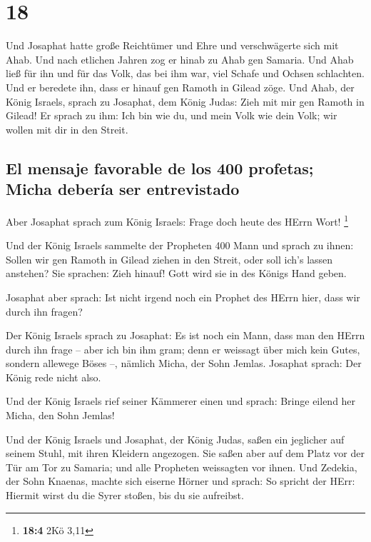 \hypertarget{section-17}{%
\section{18}\label{section-17}}

 Und Josaphat hatte große Reichtümer und Ehre und
verschwägerte sich mit Ahab.  Und nach etlichen Jahren zog
er hinab zu Ahab gen Samaria. Und Ahab ließ für ihn und für das Volk,
das bei ihm war, viel Schafe und Ochsen schlachten. Und er beredete ihn,
dass er hinauf gen Ramoth in Gilead zöge.  Und Ahab, der
König Israels, sprach zu Josaphat, dem König Judas: Zieh mit mir gen
Ramoth in Gilead! Er sprach zu ihm: Ich bin wie du, und mein Volk wie
dein Volk; wir wollen mit dir in den Streit.

\hypertarget{el-mensaje-favorable-de-los-400-profetas-micha-deberuxeda-ser-entrevistado}{%
\subsection{El mensaje favorable de los 400 profetas; Micha debería ser
entrevistado}\label{el-mensaje-favorable-de-los-400-profetas-micha-deberuxeda-ser-entrevistado}}

 Aber Josaphat sprach zum König Israels: Frage doch heute
des HErrn Wort! \footnote{\textbf{18:4} 2Kö 3,11}

 Und der König Israels sammelte der Propheten 400 Mann und
sprach zu ihnen: Sollen wir gen Ramoth in Gilead ziehen in den Streit,
oder soll ich's lassen anstehen? Sie sprachen: Zieh hinauf! Gott wird
sie in des Königs Hand geben.

 Josaphat aber sprach: Ist nicht irgend noch ein Prophet
des HErrn hier, dass wir durch ihn fragen?

 Der König Israels sprach zu Josaphat: Es ist noch ein
Mann, dass man den HErrn durch ihn frage -- aber ich bin ihm gram; denn
er weissagt über mich kein Gutes, sondern allewege Böses --, nämlich
Micha, der Sohn Jemlas. Josaphat sprach: Der König rede nicht also.

 Und der König Israels rief seiner Kämmerer einen und
sprach: Bringe eilend her Micha, den Sohn Jemlas!

 Und der König Israels und Josaphat, der König Judas,
saßen ein jeglicher auf seinem Stuhl, mit ihren Kleidern angezogen. Sie
saßen aber auf dem Platz vor der Tür am Tor zu Samaria; und alle
Propheten weissagten vor ihnen.  Und Zedekia, der Sohn
Knaenas, machte sich eiserne Hörner und sprach: So spricht der HErr:
Hiermit wirst du die Syrer stoßen, bis du sie aufreibst.

